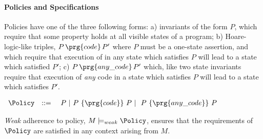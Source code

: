 \paragraph{Policies and Specifications}
Policies  have one of the three following forms:  a)  invariants of the form $P$, which require that some property holds at all visible states of a program; b) Hoare-logic-like triples,  $P\, {\prg{code}}\, P'$ where $P$ must be a one-state assertion, and which require that execution of  in any state which satisfies $P$ will lead to a state which satisfied $P'$; c)  $P\, {\prg{any\_code}}\, P'$ which, like two state invariants require that execution of {\em any} code in a state which satisfies $P$ will lead to a state which satisfies $P'$. 

\begin{definition}[Policies]
 $ ~ $ \\
 $
\begin{array}{lclcl}
\Policy &  ::= & \ P \ | \  P \ \{ \prg{code} \}\  P \ | \ \  P \ \{ \prg{any\_code} \}\ P
\end{array}
$

\end{definition}



{\em Weak} adherence to policy, $M \models_{weak} \Policy$,   
ensures that the requirements of $\Policy$ are satisfied in any context arising from $M$.

